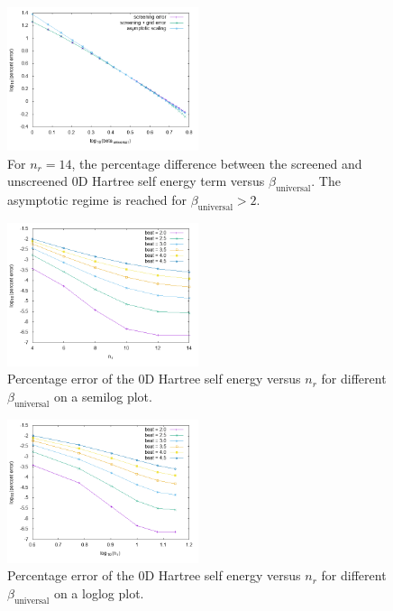 \documentclass[paper=a4, fontsize=11pt]{article} %
\numberwithin{equation}{section} %
\numberwithin{figure}{section} %
\numberwithin{table}{section} %
\begin{document}
\begin{figure}[h!] 
    \centering
    \includegraphics[width=0.5\textwidth]{diffbeta}
    \caption{For $n_r = 14$, the percentage difference between the screened and unscreened 0D Hartree self energy term versus $\beta_{\mathrm{universal}}$. The asymptotic regime is reached for $\beta_{\mathrm{universal}} > 2$.} 
    \label{fig:diffbeta}
\end{figure}

\begin{figure}[h!] 
    \centering
    \includegraphics[width=0.5\textwidth]{betaconv}
    \caption{Percentage error of the 0D Hartree self energy versus $n_r$ for different $\beta_{\mathrm{universal}}$ on a semilog plot.} 
    \label{fig:diffbeta}
\end{figure}

\begin{figure}[h!] 
    \centering
    \includegraphics[width=0.5\textwidth]{betaconvloglog}
    \caption{Percentage error of the 0D Hartree self energy versus $n_r$ for different $\beta_{\mathrm{universal}}$ on a loglog plot.} 
    \label{fig:diffbeta}
\end{figure}
\end{document}
